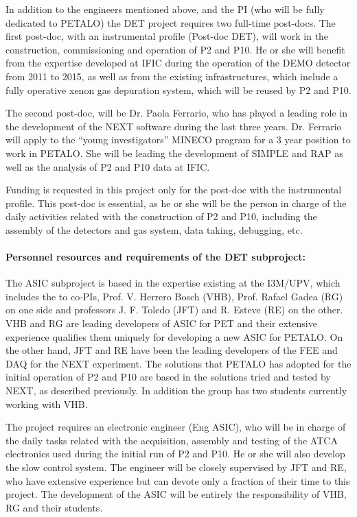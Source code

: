 In addition to the engineers mentioned above, and the PI (who will be fully dedicated to PETALO) the DET project requires two full-time post-docs. The first post-doc, with an instrumental profile (Post-doc DET), will work in the construction, commissioning and operation of P2 and P10. He or she will benefit from the expertise developed at IFIC during the operation of the DEMO detector from 2011 to 2015, as well as from the existing infrastructures, which include a fully operative xenon gas depuration system, which will be reused by P2 and P10. 

 The second post-doc, will be Dr. Paola Ferrario, who has played a leading role in the development of the NEXT software during the last three years. Dr. Ferrario will apply to the ``young investigators'' MINECO program for a 3 year position to work in PETALO. She will be leading the development of SIMPLE and RAP as well as the analysis of P2 and P10 data at IFIC.  
 
 Funding is requested in this project only for the post-doc with the instrumental profile. This post-doc is essential, as he or she will be the person in charge of the daily activities related with the construction of P2 and P10, including the assembly of the detectors and gas system, data taking, debugging, etc. 
 
 \paragraph{Personnel resources and requirements of the DET subproject:} 

The ASIC subproject is based in the expertise existing  at the I3M/UPV, which includes the to co-PIs, Prof. V. Herrero Bosch (VHB), Prof. Rafael Gadea (RG) on one side and professors J. F. Toledo (JFT) and R. Esteve (RE) on the other. VHB and RG are leading developers of ASIC for PET and their extensive experience qualifies them uniquely for developing a new ASIC for PETALO. On the other hand, JFT and RE have been the leading developers of the FEE and DAQ for the NEXT experiment. The solutions that PETALO has adopted for the initial operation of P2 and P10 are based in the solutions tried and tested by NEXT, as described previously. 
In addition the group has two students currently working with VHB.

The project requires an electronic engineer (Eng ASIC), who will be in charge of the daily tasks related with the acquisition, assembly and testing of the ATCA electronics used during the initial run of P2 and P10.  He or she will also develop the slow control system. The engineer will be closely supervised by JFT and RE, who have extensive experience but can devote only a fraction of their time to this project. The development of the ASIC will be entirely the responsibility of VHB, RG and their students. 